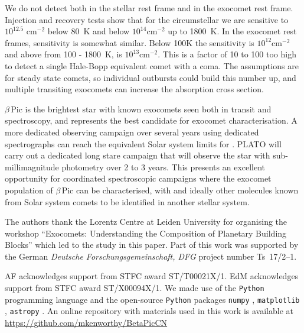 \documentclass{aa}
\newcommand{\bp}{$\beta$\,Pic}
\begin{document}
We do not detect  both in the stellar rest frame and in the exocomet rest frame.
%
Injection and recovery tests show that for the circumstellar  we are sensitive to $10^{12.5}$ cm$^{-2}$ below 80~K and below $10^{14}$cm$^{-2}$ up to 1800~K.
%
In the exocomet rest frames, sensitivity is somewhat similar.
%
Below 100K the sensitivity is $10^{12}$cm$^{-2}$ and above from 100 - 1800~K, is $10^{13}$cm$^{-2}$.
%
This is a factor of 10 to 100 too high to detect a single Hale-Bopp equivalent comet with a  coma.
%
The assumptions are for steady state comets, so individual outbursts could build this number up, and multiple transiting exocomets can increase the absorption cross section.

\bp{} is the brightest star with known exocomets seen both in transit and spectroscopy, and represents the best candidate for exocomet characterisation.
%
A more dedicated observing campaign over several years using dedicated spectrographs can reach the equivalent Solar system limits for .
%
PLATO will carry out a dedicated long stare campaign that will observe the star with sub-millimagnitude photometry over 2 to 3 years.
%
This presents an excellent opportunity for coordinated spectroscopic campaigns where the exocomet population of \bp{} can be characterised, with  and ideally other molecules known from Solar system comets to be identified in another stellar system.

\begin{acknowledgements}

The authors thank the Lorentz Centre at Leiden University for organising the workshop ``Exocomets: Understanding the Composition of Planetary Building Blocks'' which led to the study in this paper. 
%
Part of this work was supported by the German \emph{Deut\-sche For\-schungs\-ge\-mein\-schaft, DFG\/} project number Ts~17/2--1.

AF acknowledges support from STFC award ST/T00021X/1. EdM acknowledges support from STFC award ST/X00094X/1.
%
We made use of the {\tt Python} programming language \citep{rossum1995} and the open-source {\tt Python} packages {\tt numpy} \citep{walt2011}, {\tt matplotlib} \citep{hunter2007}, {\tt astropy} \citep{astropy2013}.
%      
An online repository with materials used in this work is available at \url{https://github.com/mkenworthy/BetaPicCN}

\end{acknowledgements}



\end{document}
